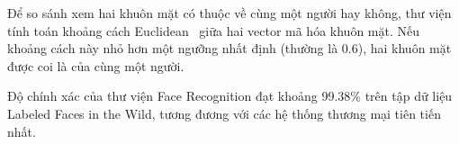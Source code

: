 Để so sánh xem hai khuôn mặt có thuộc về cùng một người hay không, thư viện tính toán khoảng cách Euclidean~\cite{euclide} giữa hai vector mã hóa khuôn mặt. Nếu khoảng cách này nhỏ hơn một ngưỡng nhất định (thường là 0.6), hai khuôn mặt được coi là của cùng một người.

Độ chính xác của thư viện Face Recognition đạt khoảng 99.38\% trên tập dữ liệu Labeled Faces in the Wild, tương đương với các hệ thống thương mại tiên tiến nhất.



    
    


    
